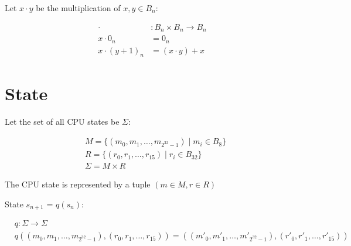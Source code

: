 \documentclass[fleqn]{article}
\begin{document}
Let $x \cdot y$ be the multiplication of $x,y \in B_n$:

\begin{align*}
\cdot &: B_n \times B_n \to B_n \\
x \cdot 0_n &= 0_n \\
x \cdot (y+1)_n &= (x \cdot y) + x
\end{align*}

\section{State}

Let the set of all CPU states be $\Sigma$:

\begin{align*}
&M = \{(m_0, m_1, \dots, m_{2^{32}-1}) \mid m_i \in B_8\} \\
&R = \{(r_0, r_1, \dots, r_{15}) \mid r_i \in B_{32}\} \\
&\Sigma = M \times R
\end{align*}

The CPU state is represented by a tuple $(m \in M, r \in R)$

State $s_{n+1}$ = $q(s_n)$:

\begin{align*}
&q : \Sigma \to \Sigma \\
&q((m_0, m_1, \dots, m_{2^{32}-1}), (r_0, r_1, \dots, r_{15}))
= ((m'_0, m'_1, \dots, m'_{2^{32}-1}), (r'_0, r'_1, \dots, r'_{15}))
\end{align*}
\end{document}
